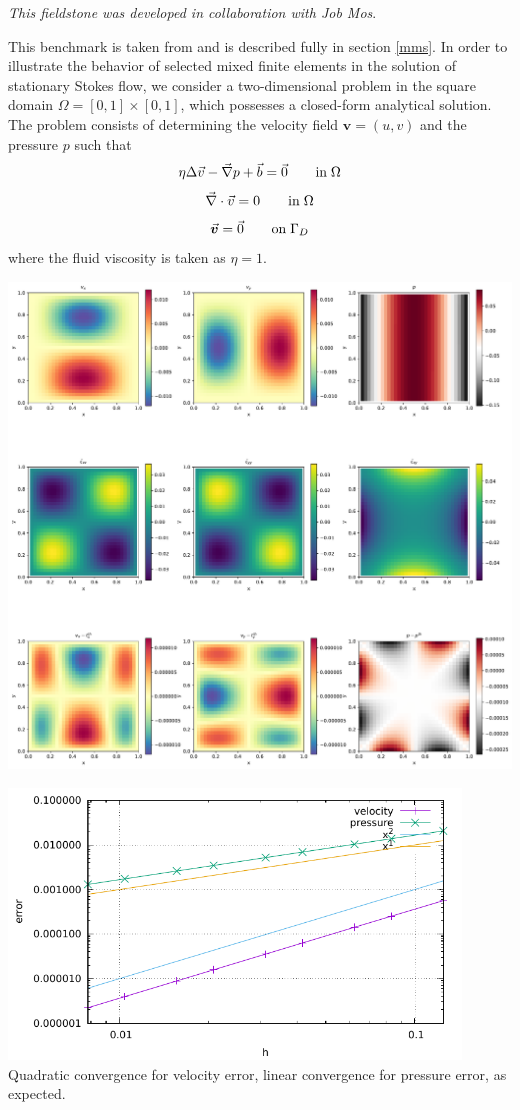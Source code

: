 
{\sl This fieldstone was developed in collaboration with Job Mos}.

This benchmark is taken from \cite{dohu03} and is described fully in section \ref{mms}. 
In order to illustrate the behavior of selected mixed finite elements in the solution 
of stationary Stokes flow,  we consider a two-dimensional problem 
in the square domain $\Omega=[0,1]\times[0,1]$, which possesses a closed-form analytical 
solution. The problem consists of determining the velocity field ${\bm v} = (u,v)$ and the 
pressure $p$ such that 
\[
\eta \Delta \vec{v} - \vec{\nabla} p + \vec{b} = \vec{0}   \quad\quad {\rm in} \; \Omega
\]
\[
\vec{\nabla} \cdot \vec{v} = 0 \quad\quad {\rm in} \; \Omega
\]
\[
\vec{\bm v}=\vec{0} \quad\quad {\rm on} \; \Gamma_D
\]
where the fluid viscosity is taken as $\eta=1$. 


\includegraphics[width=16cm]{python_codes/fieldstone_01/solution.pdf}

\begin{center}
\includegraphics[width=12cm]{python_codes/fieldstone_01/errors.pdf}\\
Quadratic convergence for velocity error, 
linear convergence for pressure error, as expected.
\end{center}

